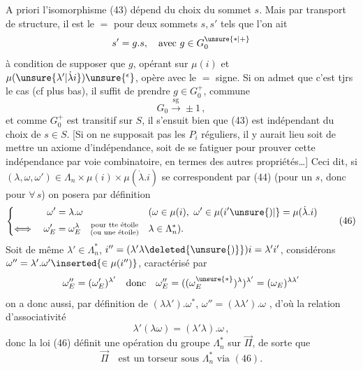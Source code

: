 A priori l'isomorphisme (43) dépend du choix du sommet $s$. Mais par transport de structure, il est le $=$ pour deux sommets $s,s'$ tels que l'on ait
\[
s'=g.s,\quad\text{avec }g\in G_0^{\unsure{*|+}}
\]
à condition de supposer que $g$, opérant sur $\mu(i)$ et $\mu(\unsure{\lambda'|\dot\lambda i})\unsure{\vphantom{i}^{\epsilon}}$, opère avec le $=$ signe. Si on admet que c'est tjrs le cas (cf plus bas), il suffit de prendre $g\in G_0^+$,  commune
\[
 G_0\xrightarrow{\mathrm{sg}}\pm1\,,\tag*{(45)}
\]
et comme $G_0^+$ est transitif sur $S$, il s'ensuit bien que (43) est indépendant du choix de $s\in S$. [Si on ne supposait pas les $P_i$ réguliers, il y aurait lieu soit de mettre un axiome d'indépendance, soit de se fatiguer pour prouver cette indépendance par voie combinatoire, en termes des autres propriétés\ldots] Ceci dit, si $(\lambda,\omega,\omega')\in\Lambda_n\times\mu(i)\times\mu(\dot\lambda.i)$ se correspondent par (44) (pour un $s$, donc pour $\forall\,s$) on posera par définition
\[
\left\{\begin{aligned}
 \omega'&=\lambda.\omega &&(\omega\in\mu(i),\ \omega'\in\mu(i'\unsure{)|\vphantom{)}}=\mu(\dot\lambda.i)\\
 \Longleftrightarrow\quad\omega'_E&=\omega_E^\lambda
 \quad\substack{\text{pour tte étoile}\\\text{(ou une étoile)}}&&\lambda\in\Lambda_n^*).
\end{aligned}\right.
\tag*{(46)}
\]
Soit de même $\lambda'\in\Lambda_n^*$, $i''=(\lambda'\lambda\deleted{\unsure{)}})i=\lambda'i'$, considérons $\omega''=\lambda'.\omega'\inserted{\in\mu(i'')}$, caractérisé par
\[
\omega''_E=(\omega'_E)^{\lambda'}\quad\text{donc}\quad
 \omega''_E=((\omega^{\unsure{*}}_E)^\lambda)^{\lambda'}=(\omega_E)^{\lambda\lambda'}
\]
on a donc aussi, par définition de $(\lambda\lambda').\omega^{*}$, $\omega''=(\lambda\lambda').\omega$ , d'où la relation d'associativité
\[
\lambda'(\lambda\omega)=(\lambda'\lambda).\omega\,,\tag*{(47)}
\]
donc la loi (46) définit  une opération du groupe $\Lambda_n^*$ sur $\vec\Pi$,  de sorte que
\[
\vec\Pi\quad\text{est un torseur sous }\Lambda_n^*\text{ via }(46).\tag*{(48)}
\]

